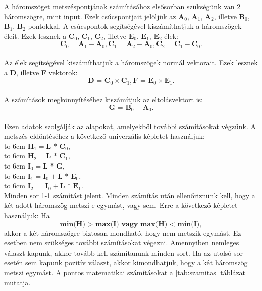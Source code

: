 \label{chap:utkozesek}
A háromszöget metszéspontjának számításához elsősorban szükségünk van 2 háromszögre, mint input. Ezek csúcspontjait jelöljük az $\textbf{A}_0$, $\textbf{A}_1$, $\textbf{A}_2$, illetve $\textbf{B}_0$, $\textbf{B}_1$, $\textbf{B}_2$ pontokkal. A csúcspontok segítségével kiszámíthatjuk a háromszögek éleit. Ezek lesznek a $\textbf{C}_0$, $\textbf{C}_1$, $\textbf{C}_2$, illetve $\textbf{E}_0$, $\textbf{E}_1$, $\textbf{E}_2$ élek: \\
$$\textbf{C}_0 = \textbf{A}_1 - \textbf{A}_0, \textbf{C}_1 = \textbf{A}_2 - \textbf{A}_0, \textbf{C}_2 = \textbf{C}_1 - \textbf{C}_0 .$$\\
Az élek segítségével kiszámíthatjuk a háromszögek normál vektorait. Ezek lesznek a \textbf{D}, illetve \textbf{F} vektorok:  \\
$$\textbf{D = C}_0 \times \textbf{C}_1,\textbf{F = E}_0 \times \textbf{E}_1.$$\\
A számítások megkönnyítéséhez kiszámítjuk az eltolásvektort is:  \\
$$\textbf{G = B}_0 -\textbf{A}_0.$$\\
Ezen adatok szolgálják az alapokat, amelyekből további számításokat végzünk. A metszés eldöntéséhez a következő univerzális képletet használjuk:\\
\hbox to 6cm{}	$\textbf{H}_1 = \textbf{L * C}_0,$\\
\hbox to 6cm{}	$\textbf{H}_2 = \textbf{L * C}_1,$\\
\hbox to 6cm{}	$\textbf{I}_0 = \textbf{L * G},$\\
\hbox to 6cm{}	$\textbf{I}_1 = \textbf{I}_0 + \textbf{L * E}_0,$\\
\hbox to 6cm{}	$\textbf{I}_2 =\textbf{ I}_0 + \textbf{L * E}_1.$\\

Minden sor 1-1 számítást jelent. Minden számítás után ellenőriznünk kell, hogy a két adott háromszög metszi-e egymást, vagy sem. Erre a következő képletet használjuk: Ha\\
$$\textbf{min(H) > max(I) vagy max(H) < min(I)},$$akkor a két háromszögre biztosan mondható, hogy nem metszik egymást. Ez esetben nem szükséges további számításokat végezni. Amennyiben nemleges választ kapunk, akkor tovább kell számítanunk minden sort. Ha az utolsó sor esetén sem kapunk pozitív választ, akkor kimondhatjuk, hogy a két háromszög metszi egymást. A pontos matematikai számításokat a \ref{tab:szamitas} táblázat mutatja.

\newpage


